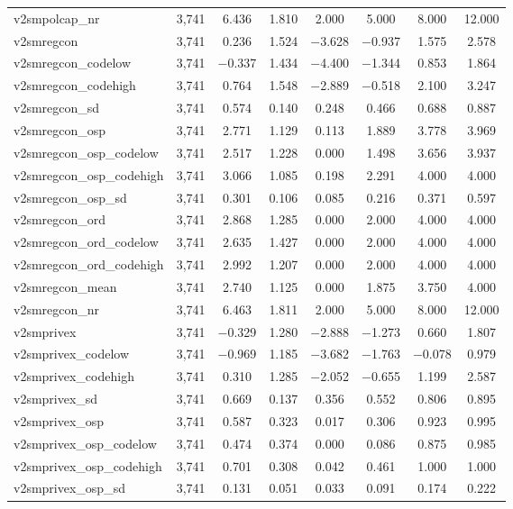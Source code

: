 \begin{table}[!htbp]
\begin{tabular}{@{\extracolsep{5pt}}lccccccc}
v2smpolcap\_nr & 3,741 & 6.436 & 1.810 & 2.000 & 5.000 & 8.000 & 12.000 \\ 
v2smregcon & 3,741 & 0.236 & 1.524 & $-$3.628 & $-$0.937 & 1.575 & 2.578 \\ 
v2smregcon\_codelow & 3,741 & $-$0.337 & 1.434 & $-$4.400 & $-$1.344 & 0.853 & 1.864 \\ 
v2smregcon\_codehigh & 3,741 & 0.764 & 1.548 & $-$2.889 & $-$0.518 & 2.100 & 3.247 \\ 
v2smregcon\_sd & 3,741 & 0.574 & 0.140 & 0.248 & 0.466 & 0.688 & 0.887 \\ 
v2smregcon\_osp & 3,741 & 2.771 & 1.129 & 0.113 & 1.889 & 3.778 & 3.969 \\ 
v2smregcon\_osp\_codelow & 3,741 & 2.517 & 1.228 & 0.000 & 1.498 & 3.656 & 3.937 \\ 
v2smregcon\_osp\_codehigh & 3,741 & 3.066 & 1.085 & 0.198 & 2.291 & 4.000 & 4.000 \\ 
v2smregcon\_osp\_sd & 3,741 & 0.301 & 0.106 & 0.085 & 0.216 & 0.371 & 0.597 \\ 
v2smregcon\_ord & 3,741 & 2.868 & 1.285 & 0.000 & 2.000 & 4.000 & 4.000 \\ 
v2smregcon\_ord\_codelow & 3,741 & 2.635 & 1.427 & 0.000 & 2.000 & 4.000 & 4.000 \\ 
v2smregcon\_ord\_codehigh & 3,741 & 2.992 & 1.207 & 0.000 & 2.000 & 4.000 & 4.000 \\ 
v2smregcon\_mean & 3,741 & 2.740 & 1.125 & 0.000 & 1.875 & 3.750 & 4.000 \\ 
v2smregcon\_nr & 3,741 & 6.463 & 1.811 & 2.000 & 5.000 & 8.000 & 12.000 \\ 
v2smprivex & 3,741 & $-$0.329 & 1.280 & $-$2.888 & $-$1.273 & 0.660 & 1.807 \\ 
v2smprivex\_codelow & 3,741 & $-$0.969 & 1.185 & $-$3.682 & $-$1.763 & $-$0.078 & 0.979 \\ 
v2smprivex\_codehigh & 3,741 & 0.310 & 1.285 & $-$2.052 & $-$0.655 & 1.199 & 2.587 \\ 
v2smprivex\_sd & 3,741 & 0.669 & 0.137 & 0.356 & 0.552 & 0.806 & 0.895 \\ 
v2smprivex\_osp & 3,741 & 0.587 & 0.323 & 0.017 & 0.306 & 0.923 & 0.995 \\ 
v2smprivex\_osp\_codelow & 3,741 & 0.474 & 0.374 & 0.000 & 0.086 & 0.875 & 0.985 \\ 
v2smprivex\_osp\_codehigh & 3,741 & 0.701 & 0.308 & 0.042 & 0.461 & 1.000 & 1.000 \\ 
v2smprivex\_osp\_sd & 3,741 & 0.131 & 0.051 & 0.033 & 0.091 & 0.174 & 0.222 \\ 

\end{tabular}
\end{table}
